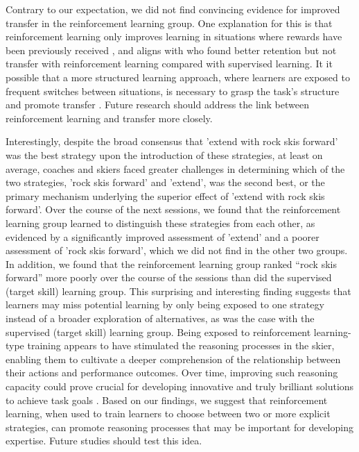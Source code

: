 \documentclass[pdflatex,sn-mathphys-num]{sn-jnl}%
\theoremstyle{thmstyleone}%
\theoremstyle{thmstyletwo}%
\theoremstyle{thmstylethree}%
\begin{document}
Contrary to our expectation, we did not find convincing evidence for improved transfer in the reinforcement learning group. One explanation for this is that reinforcement learning only improves learning in situations where rewards have been previously received \cite{robertson_memory_2018}, and aligns with \cite{hasson_reinforcement_2015} who found better retention but not transfer with reinforcement learning compared with supervised learning. It it possible that a more structured learning approach, where learners are exposed to frequent switches between situations, is necessary to grasp the task's structure and promote transfer \cite{braun_structure_2010}. Future research should address the link between reinforcement learning and transfer more closely. 

Interestingly, despite the broad consensus that 'extend with rock skis forward' was the best strategy upon the introduction of these strategies, at least on average, coaches and skiers faced greater challenges in determining which of the two strategies, 'rock skis forward' and 'extend', was the second best, or the primary mechanism underlying the superior effect of 'extend with rock skis forward'. Over the course of the next sessions, we found that the reinforcement learning group learned to distinguish these strategies from each other, as evidenced by a significantly improved assessment of 'extend' and a poorer assessment of 'rock skis forward', which we did not find in the other two groups. In addition, we found that the reinforcement learning group ranked “rock skis forward” more poorly over the course of the sessions than did the supervised (target skill) learning group. This surprising and interesting finding suggests that learners may miss potential learning by only being exposed to one strategy instead of a broader exploration of alternatives, as was the case with the supervised (target skill) learning group. Being exposed to reinforcement learning-type training appears to have stimulated the reasoning processes in the skier, enabling them to cultivate a deeper comprehension of the relationship between their actions and performance outcomes\cite{tsay_strategic_2023}. Over time, improving such reasoning capacity could prove crucial for developing innovative and truly brilliant solutions to achieve task goals  \cite{ericsson_scientific_1998}. Based on our findings, we suggest that reinforcement learning, when used to train learners to choose between two or more explicit strategies, can promote reasoning processes that may be important for developing expertise. Future studies should test this idea.
\end{document}
